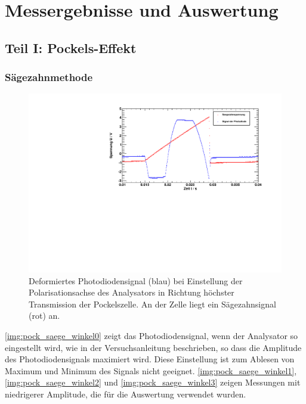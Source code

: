 \section{Messergebnisse und Auswertung}

\subsection{Teil I: Pockels-Effekt}

\subsubsection{Sägezahnmethode}

\begin{figure}[H]
\begin{center}
  \includegraphics[width=15cm]{../img/pock_saege_winkel0.pdf}
  \caption{Deformiertes Photodiodensignal (blau) bei Einstellung der Polarisationsachse des Analysators in
  Richtung höchster Transmission der Pockelszelle. An der Zelle liegt ein Sägezahnsignal (rot) an.}
  \label{img:pock_saege_winkel0}
\end{center}
\end{figure}

\autoref{img:pock_saege_winkel0} zeigt das Photodiodensignal, wenn der Analysator so eingestellt wird,
wie in der Versuchsanleitung beschrieben, so dass die Amplitude des Photodiodensignals maximiert wird.
Diese Einstellung ist zum Ablesen von Maximum und Minimum des Signals nicht geeignet.
\autoref{img:pock_saege_winkel1}, \autoref{img:pock_saege_winkel2} und \autoref{img:pock_saege_winkel3}
zeigen Messungen mit niedrigerer Amplitude, die für die Auswertung verwendet wurden.

